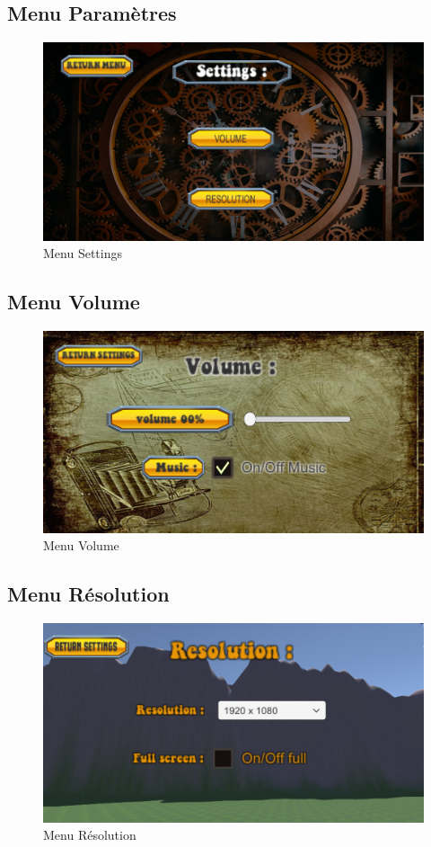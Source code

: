 \documentclass[a4paper]{article}
\begin{document}
	\subsection{Menu Paramètres}
	\begin{figure}[!ht]
		\centering
		\includegraphics[scale=0.3]{images/settings.png}
		\caption{Menu Settings}
	\end{figure}

	\clearpage

	\subsection{Menu Volume}
	\begin{figure}[!ht]
		\centering
		\includegraphics[scale=0.3]{images/volume.png}
		\caption{Menu Volume}
	\end{figure}
	
	\subsection{Menu Résolution}
	\begin{figure}[!ht]
		\centering
		\includegraphics[scale=0.3]{images/resolution.png}
		\caption{Menu Résolution}
	\end{figure}
\end{document}

